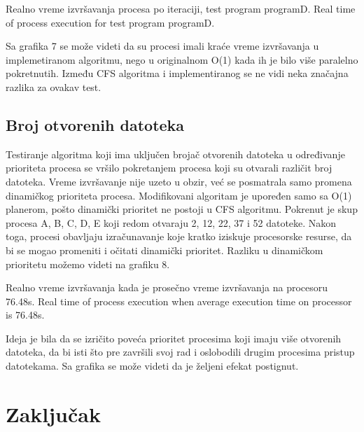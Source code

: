     {Realno vreme izvršavanja procesa po iteraciji, test program programD.}
    {Real time of process execution for test program programD.}

Sa grafika 7 se može videti da su procesi imali kraće vreme izvršavanja u implemetiranom
algoritmu, nego u originalnom O(1) kada ih je bilo više paralelno pokretnutih. Između CFS
algoritma i implementiranog se ne vidi neka značajna razlika za ovakav test.

\subsection{Broj otvorenih datoteka}

Testiranje algoritma koji ima uključen brojač otvorenih datoteka u određivanje prioriteta
procesa se vršilo pokretanjem procesa koji su otvarali različit broj datoteka. Vreme
izvršavanje nije uzeto u obzir, već se posmatrala samo promena dinamičkog prioriteta
procesa. Modifikovani algoritam je upoređen samo sa O(1) planerom, pošto dinamički
prioritet ne postoji u CFS algoritmu.
Pokrenut je skup procesa A, B, C, D, E koji redom otvaraju 2, 12, 22, 37 i 52 datoteke.
Nakon toga, procesi obavljaju izračunavanje koje kratko iziskuje procesorske resurse, da bi se
mogao promeniti i očitati dinamički prioritet. Razliku u dinamičkom prioritetu možemo
videti na grafiku 8.

    {Realno vreme izvršavanja kada je prosečno vreme izvršavanja na procesoru 76.48s.}
    {Real time of process execution when average execution time on processor is 76.48s.}

Ideja je bila da se izričito poveća prioritet procesima koji imaju više otvorenih datoteka, da bi
isti što pre završili svoj rad i oslobodili drugim procesima pristup datotekama. Sa grafika se
može videti da je željeni efekat postignut.

\section{Zaključak}

